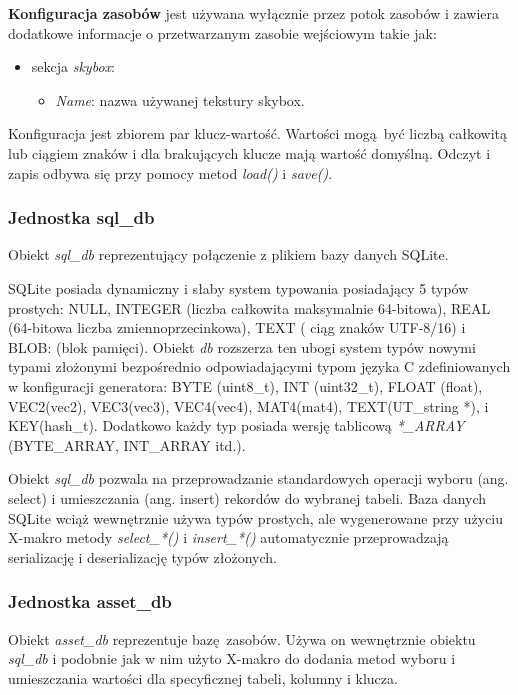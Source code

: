 \textbf{Konfiguracja zasobów} jest używana wyłącznie przez potok zasobów i zawiera dodatkowe informacje o przetwarzanym zasobie wejściowym takie jak:
\begin{itemize}
	\item sekcja \textit{skybox}:
	\begin{itemize}
		\item \textit{Name}: nazwa używanej tekstury skybox.
	\end{itemize}
\end{itemize}

Konfiguracja jest zbiorem par klucz-wartość.
Wartości mogą być liczbą całkowitą lub ciągiem znaków i dla brakujących klucze mają wartość domyślną.
Odczyt i zapis odbywa się przy pomocy metod \textit{load()} i \textit{save()}.


\subsubsection{Jednostka sql\_db}
Obiekt \textit{sql\_db} reprezentujący połączenie z plikiem bazy danych SQLite.

SQLite posiada dynamiczny i słaby system typowania posiadający 5 typów prostych:
NULL, INTEGER (liczba całkowita maksymalnie 64-bitowa), REAL (64-bitowa liczba zmiennoprzecinkowa), TEXT ( ciąg znaków UTF-8/16) i BLOB: (blok pamięci).
Obiekt \textit{db} rozszerza ten ubogi system typów nowymi typami złożonymi bezpośrednio odpowiadającymi typom języka C zdefiniowanych w konfiguracji generatora: BYTE (uint8\_t), INT (uint32\_t), FLOAT (float), VEC2(vec2), VEC3(vec3), VEC4(vec4), MAT4(mat4), TEXT(UT\_string *), i KEY(hash\_t).
Dodatkowo każdy typ posiada wersję tablicową \textit{*\_ARRAY} (BYTE\_ARRAY, INT\_ARRAY itd.).

Obiekt \textit{sql\_db} pozwala na przeprowadzanie standardowych operacji wyboru (ang. select) i umieszczania (ang. insert) rekordów do wybranej tabeli.
Baza danych SQLite wciąż wewnętrznie używa typów prostych, ale wygenerowane przy użyciu X-makro metody \textit{select\_*()} i \textit{insert\_*()} automatycznie przeprowadzają serializację i deserializację typów złożonych.


\subsubsection{Jednostka asset\_db}
Obiekt \textit{asset\_db} reprezentuje bazę zasobów.
Używa on wewnętrznie obiektu \textit{sql\_db} i podobnie jak w nim użyto X-makro do dodania metod wyboru i umieszczania wartości dla specyficznej tabeli, kolumny i klucza.

